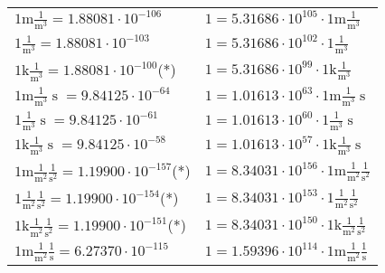 \begin{center}
\begin{longtable}{l l}
{\color{gray}$1 \bm{\mathrm{ m}}\frac1{\operatorname{m}^3}{}{}{} = 1.88081\cdot10^{-106} $}   & {\color{gray}$ 1 = 5.31686\cdot10^{105} \cdot 1 \bm{\mathrm{ m}}\frac1{\operatorname{m}^3}{}{}{}$}  \\
{\color{black}$1 \bm{\mathrm{ }}\frac1{\operatorname{m}^3}{}{}{} = 1.88081\cdot10^{-103} $}   & {\color{black}$ 1 = 5.31686\cdot10^{102} \cdot 1 \bm{\mathrm{ }}\frac1{\operatorname{m}^3}{}{}{}$}  \\
{\color{gray}$1 \bm{\mathrm{ k}}\frac1{\operatorname{m}^3}{}{}{} = 1.88081\cdot10^{-100} $}\quad(*) & {\color{gray}$ 1 = 5.31686\cdot10^{99} \cdot 1 \bm{\mathrm{ k}}\frac1{\operatorname{m}^3}{}{}{}$}  \\
{\color{gray}$1 \bm{\mathrm{ m}}\frac1{\operatorname{m}^3}{\operatorname{s}}{}{} = 9.84125\cdot10^{-64} $}   & {\color{gray}$ 1 = 1.01613\cdot10^{63} \cdot 1 \bm{\mathrm{ m}}\frac1{\operatorname{m}^3}{\operatorname{s}}{}{}$}  \\
{\color{black}$1 \bm{\mathrm{ }}\frac1{\operatorname{m}^3}{\operatorname{s}}{}{} = 9.84125\cdot10^{-61} $}   & {\color{black}$ 1 = 1.01613\cdot10^{60} \cdot 1 \bm{\mathrm{ }}\frac1{\operatorname{m}^3}{\operatorname{s}}{}{}$}  \\
{\color{gray}$1 \bm{\mathrm{ k}}\frac1{\operatorname{m}^3}{\operatorname{s}}{}{} = 9.84125\cdot10^{-58} $}   & {\color{gray}$ 1 = 1.01613\cdot10^{57} \cdot 1 \bm{\mathrm{ k}}\frac1{\operatorname{m}^3}{\operatorname{s}}{}{}$}  \\
{\color{gray}$1 \bm{\mathrm{ m}}\frac1{\operatorname{m}^2}\frac1{\operatorname{s}^2}{}{} = 1.19900\cdot10^{-157} $}\quad(*) & {\color{gray}$ 1 = 8.34031\cdot10^{156} \cdot 1 \bm{\mathrm{ m}}\frac1{\operatorname{m}^2}\frac1{\operatorname{s}^2}{}{}$}  \\
{\color{black}$1 \bm{\mathrm{ }}\frac1{\operatorname{m}^2}\frac1{\operatorname{s}^2}{}{} = 1.19900\cdot10^{-154} $}\quad(*) & {\color{black}$ 1 = 8.34031\cdot10^{153} \cdot 1 \bm{\mathrm{ }}\frac1{\operatorname{m}^2}\frac1{\operatorname{s}^2}{}{}$}  \\
{\color{gray}$1 \bm{\mathrm{ k}}\frac1{\operatorname{m}^2}\frac1{\operatorname{s}^2}{}{} = 1.19900\cdot10^{-151} $}\quad(*) & {\color{gray}$ 1 = 8.34031\cdot10^{150} \cdot 1 \bm{\mathrm{ k}}\frac1{\operatorname{m}^2}\frac1{\operatorname{s}^2}{}{}$}  \\
{\color{gray}$1 \bm{\mathrm{ m}}\frac1{\operatorname{m}^2}\frac1{\operatorname{s}}{}{} = 6.27370\cdot10^{-115} $}   & {\color{gray}$ 1 = 1.59396\cdot10^{114} \cdot 1 \bm{\mathrm{ m}}\frac1{\operatorname{m}^2}\frac1{\operatorname{s}}{}{}$}  \\

\end{longtable}
\end{center}
